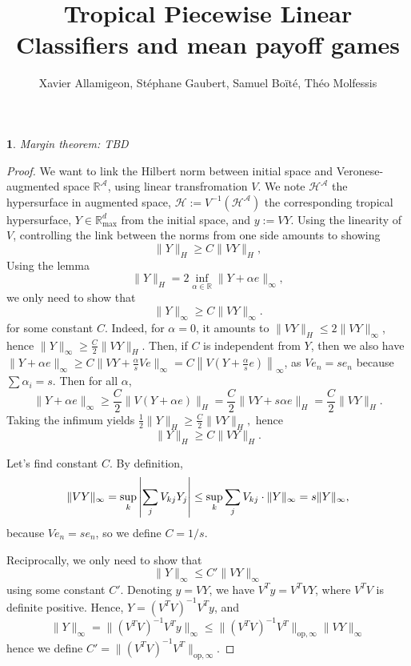 \documentclass[oneside,english,a4paper]{amsart}
\numberwithin{equation}{section}
\numberwithin{figure}{section}
\theoremstyle{plain}
\theoremstyle{definition}
\theoremstyle{plain}
\newtheorem{prop}[thm]{\protect\propositionname}
\theoremstyle{remark}
\theoremstyle{plain}
\theoremstyle{definition}
\theoremstyle{definition}
\providecommand{\propositionname}{Proposition}
\begin{document}
\title{Tropical Piecewise Linear Classifiers and mean payoff games}
\author{Xavier Allamigeon, Stéphane Gaubert, Samuel Boïté, Théo Molfessis}
\maketitle


\begin{prop}
Margin theorem: TBD
\end{prop}
\begin{proof}
We want to link the Hilbert norm between initial space and Veronese-augmented
space $\mathbb{R}^{\mathcal{A}}$, using linear transfromation $V$.
We note $\mathcal{H}^{\mathcal{A}}$ the hypersurface in augmented
space, $\mathcal{H}:=V^{-1}(\mathcal{H}^{\mathcal{A}})$ the corresponding
tropical hypersurface, $Y\in\mathbb{R}_{\max}^{d}$ from the initial
space, and $y:=VY$. Using the linearity of $V$, controlling the
link between the norms from one side amounts to showing 
\[
\lVert Y\rVert_{H}\ge C\lVert VY\rVert_{H},
\]
Using the lemma 
\[
\lVert Y\rVert_{H}=2\inf_{\alpha\in\mathbb{R}}\lVert Y+\alpha e\rVert_{\infty},
\]
we only need to show that 
\[
\lVert Y\rVert_{\infty}\ge C\lVert VY\rVert_{\infty}.
\]
for some constant $C$. Indeed, for $\alpha=0$, it amounts to $\lVert VY\rVert_{H}\le2\lVert VY\rVert_{\infty}$,
hence $\lVert Y\rVert_{\infty}\ge\frac{C}{2}\lVert VY\rVert_{H}$.
Then, if $C$ is independent from $Y$, then we also have $\lVert Y+\alpha e\rVert_{\infty}\ge C\lVert VY+\frac{\alpha}{s}Ve\rVert_{\infty}=C\left\lVert V\left(Y+\frac{\alpha}{s}e\right)\right\rVert_{\infty}$,
as $Ve_{n}=se_{n}$ because $\sum\alpha_{i}=s$. Then for all $\alpha$,
\[
\lVert Y+\alpha e\rVert_{\infty}\ge\frac{C}{2}\lVert V(Y+\alpha e)\rVert_{H}=\frac{C}{2}\lVert VY+s\alpha e\lVert_{H}=\frac{C}{2}\lVert VY\lVert_{H}.
\]
Taking the infimum yields $\frac{1}{2}\lVert Y\rVert_{H}\ge\frac{C}{2}\lVert VY\rVert_{H},$
hence
\[
\lVert Y\rVert_{H}\ge C\lVert VY\rVert_{H}.
\]

Let's find constant $C$. By definition,
\[
\lVert VY\rVert_{\infty} =\sup_{k}\left|\sum_{j}V_{kj}Y_{j}\right|
 \le\sup_{k}\sum_{j}V_{kj}\cdot\lVert Y\rVert_{\infty}\\
 =s\lVert Y\rVert_{\infty},
\]
because $Ve_{n}=se_{n}$, so we define $C=1/s$.

Reciprocally, we only need to show that 
\[
\lVert Y\rVert_{\infty}\le C'\lVert VY\rVert_{\infty}
\]
using some constant $C'$. Denoting $y=VY$, we have $V^{T}y=V^{T}VY$,
where $V^{T}V$ is definite positive. Hence, $Y=(V^{T}V)^{-1}V^{T}y$,
and
\[
\lVert Y\rVert_{\infty}=\lVert(V^{T}V)^{-1}V^{T}y\rVert_{\infty}\le\lVert(V^{T}V)^{-1}V^{T}\rVert_{\text{op},\infty}\lVert VY\rVert_{\infty}
\]
hence we define $C'=\lVert(V^{T}V)^{-1}V^{T}\rVert_{\text{op},\infty}$.



\end{proof}
\end{document}
